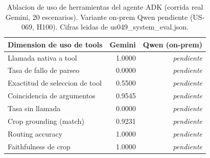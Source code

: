 \begin{table}
\caption{Ablacion de uso de herramientas del agente ADK (corrida real Gemini, 20 escenarios). Variante on-prem Qwen pendiente (US-069, H100). Cifras leidas de us049\_system\_eval.json.}
\label{tab:tool_ablation}
\begin{tabular}{lrr}
\toprule
Dimension de uso de tools & Gemini & Qwen (on-prem) \\
\midrule
Llamada nativa a tool & 1.0000 & \textit{pendiente} \\
Tasa de fallo de parseo & 0.0000 & \textit{pendiente} \\
Exactitud de seleccion de tool & 0.5500 & \textit{pendiente} \\
Coincidencia de argumentos & 0.9545 & \textit{pendiente} \\
Tasa sin llamada & 0.0000 & \textit{pendiente} \\
Crop grounding (match) & 0.9231 & \textit{pendiente} \\
Routing accuracy & 1.0000 & \textit{pendiente} \\
Faithfulness de crop & 1.0000 & \textit{pendiente} \\
\bottomrule
\end{tabular}
\end{table}
